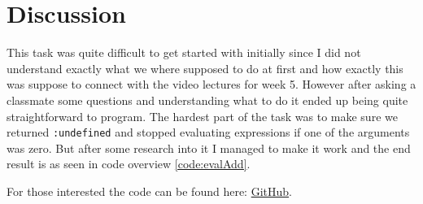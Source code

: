 \documentclass[a4paper,11pt]{article}
\begin{document}
\section*{Discussion}
This task was quite difficult to get started with initially since I did not understand exactly what we where supposed to do at first and how exactly this was 
suppose to connect with the video lectures for week 5. However after asking a classmate some questions and understanding what to do it ended up being quite 
straightforward to program. The hardest part of the task was to make sure we returned {\tt :undefined} and stopped evaluating expressions if one of the arguments 
was zero. But after some research into it I managed to make it work and the end result is as seen in code overview \ref{code:evalAdd}.

For those interested the code can be found here: 
\href{https://github.com/adrian-jonsson-sjoedin/ID1019-Programming-II/tree/main/Task3_Solution}{GitHub}.
\end{document}
